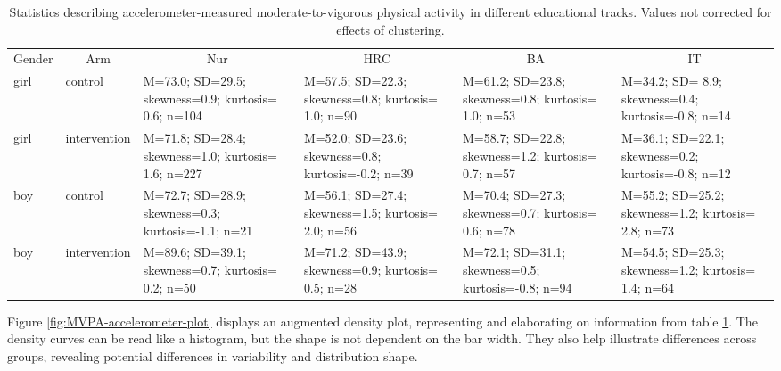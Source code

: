 \documentclass[british,man]{apa6}
\makeatletter
\newenvironment{lltable}{\begin{landscape}\begin{center}\begin{ThreePartTable}}{\end{ThreePartTable}\end{center}\end{landscape}}
\newcommand\LastLTentrywidth{1em}
\newlength\longtablewidth
\newcommand{\getlongtablewidth}{\begingroup \ifcsname LT@\roman{LT@tables}\endcsname \global\longtablewidth=0pt \renewcommand{\LT@entry}[2]{\global\advance\longtablewidth by ##2\relax\gdef\LastLTentrywidth{##2}}\@nameuse{LT@\roman{LT@tables}} \fi \endgroup}
\makeatother
\begin{document}
\begin{lltable}


\begin{longtable}{llllll}\noalign{\getlongtablewidth\global\LTcapwidth=\longtablewidth}
\caption{\label{tab:mvpa-table}Statistics describing accelerometer-measured moderate-to-vigorous physical activity 
                    in different educational tracks. Values not corrected for effects of clustering.}\\
\toprule
Gender & \multicolumn{1}{c}{Arm} & \multicolumn{1}{c}{Nur} & \multicolumn{1}{c}{HRC} & \multicolumn{1}{c}{BA} & \multicolumn{1}{c}{IT}\\
\midrule
girl & control & M=73.0; SD=29.5; skewness=0.9; kurtosis= 0.6; n=104 & M=57.5; SD=22.3; skewness=0.8; kurtosis= 1.0; n=90 & M=61.2; SD=23.8; skewness=0.8; kurtosis= 1.0; n=53 & M=34.2; SD= 8.9; skewness=0.4; kurtosis=-0.8; n=14\\
girl & intervention & M=71.8; SD=28.4; skewness=1.0; kurtosis= 1.6; n=227 & M=52.0; SD=23.6; skewness=0.8; kurtosis=-0.2; n=39 & M=58.7; SD=22.8; skewness=1.2; kurtosis= 0.7; n=57 & M=36.1; SD=22.1; skewness=0.2; kurtosis=-0.8; n=12\\
boy & control & M=72.7; SD=28.9; skewness=0.3; kurtosis=-1.1; n=21 & M=56.1; SD=27.4; skewness=1.5; kurtosis= 2.0; n=56 & M=70.4; SD=27.3; skewness=0.7; kurtosis= 0.6; n=78 & M=55.2; SD=25.2; skewness=1.2; kurtosis= 2.8; n=73\\
boy & intervention & M=89.6; SD=39.1; skewness=0.7; kurtosis= 0.2; n=50 & M=71.2; SD=43.9; skewness=0.9; kurtosis= 0.5; n=28 & M=72.1; SD=31.1; skewness=0.5; kurtosis=-0.8; n=94 & M=54.5; SD=25.3; skewness=1.2; kurtosis= 1.4; n=64\\
\bottomrule
\end{longtable}
\end{lltable}

Figure \ref{fig:MVPA-accelerometer-plot} displays an augmented density plot, representing and elaborating on information from table \ref{tab:mvpa-table}. The density curves can be read like a histogram, but the shape is not dependent on the bar width. They also help illustrate differences across groups, revealing potential differences in variability and distribution shape.
\end{document}
